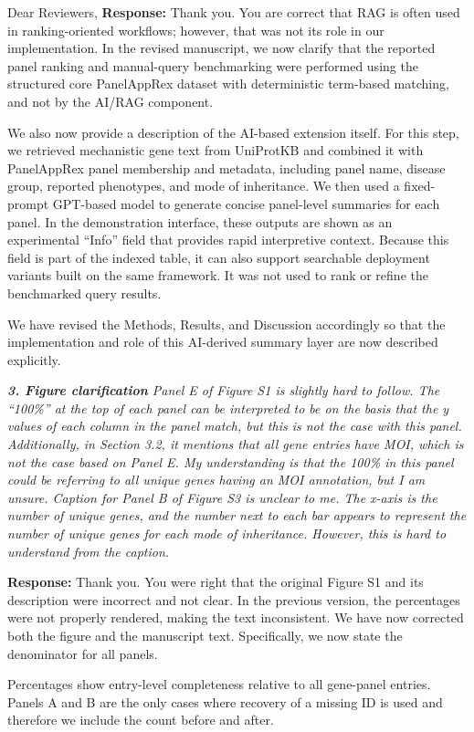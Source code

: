 \documentclass[12pt,a4paper]{letter}
\begin{document}
\begin{letter}{Dear Reviewers,}
\textbf{Response:} Thank you. You are correct that RAG is often used in ranking-oriented workflows; however, that was not its role in our implementation. In the revised manuscript, we now clarify that the reported panel ranking and manual-query benchmarking were performed using the structured core PanelAppRex dataset with deterministic term-based matching, and not by the AI/RAG component.

We also now provide a description of the AI-based extension itself. For this step, we retrieved mechanistic gene text from UniProtKB and combined it with PanelAppRex panel membership and metadata, including panel name, disease group, reported phenotypes, and mode of inheritance. We then used a fixed-prompt GPT-based model to generate concise panel-level summaries for each panel. In the demonstration interface, these outputs are shown as an experimental ``Info'' field that provides rapid interpretive context. Because this field is part of the indexed table, it can also support searchable deployment variants built on the same framework. It was not used to rank or refine the benchmarked query results.

We have revised the Methods, Results, and Discussion accordingly so that the implementation and role of this AI-derived summary layer are now described explicitly.

\textit{\textbf{3. Figure clarification}
Panel E of Figure S1 is slightly hard to follow. The “100\%” at the top of each panel can be interpreted to be on the basis that the y values of each column in the panel match, but this is not the case with this panel. Additionally, in Section 3.2, it mentions that all gene entries have MOI, which is not the case based on Panel E. My understanding is that the 100\% in this panel could be referring to all unique genes having an MOI annotation, but I am unsure.
Caption for Panel B of Figure S3 is unclear to me. The x-axis is the number of unique genes, and the number next to each bar appears to represent the number of unique genes for each mode of inheritance. However, this is hard to understand from the caption.}

\textbf{Response:} Thank you. You were right that the original Figure S1 and its description were incorrect and not  clear. In the previous version, the percentages were not properly rendered, making the text inconsistent. We have now corrected both the figure and the manuscript text. Specifically, we now state the denominator for all panels. 

Percentages show entry-level completeness relative to all gene-panel entries. 
Panels A and B are the only cases where recovery of a missing ID is used and therefore we include the count before and after. 


\end{letter}
\end{document}
